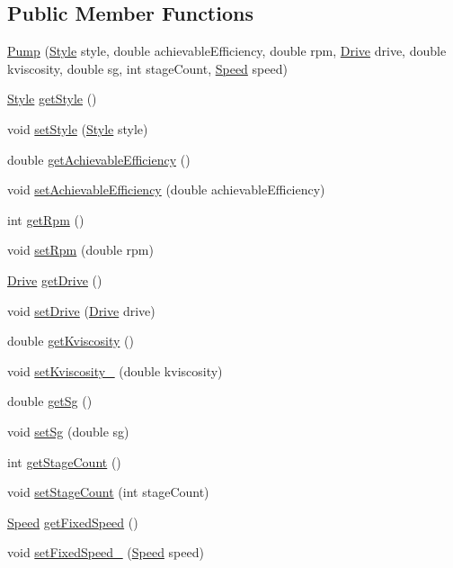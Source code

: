\subsection*{Public Member Functions}
\begin{DoxyCompactItemize}
\item 
\hyperlink{class_pump_a40479645281006efd81d3074f64d84ea}{Pump} (\hyperlink{class_pump_aef354601ce4218258cc898b35a1e90ff}{Style} style, double achievable\+Efficiency, double rpm, \hyperlink{class_pump_a32bf0ade131a11bb3b3fb374f638e983}{Drive} drive, double kviscosity, double sg, int stage\+Count, \hyperlink{class_pump_ae443603074ebca82f0b89209482d10b6}{Speed} speed)
\item 
\hyperlink{class_pump_aef354601ce4218258cc898b35a1e90ff}{Style} \hyperlink{class_pump_ab75d877769b5232c5ab7b4d92940579a}{get\+Style} ()
\item 
void \hyperlink{class_pump_a4852cb47f40a46ba84c7dff91d1abd53}{set\+Style} (\hyperlink{class_pump_aef354601ce4218258cc898b35a1e90ff}{Style} style)
\item 
double \hyperlink{class_pump_acf100af543142ab8404fc0ce2df1d157}{get\+Achievable\+Efficiency} ()
\item 
void \hyperlink{class_pump_a183f83fcc4b77e330451000df4d91046}{set\+Achievable\+Efficiency} (double achievable\+Efficiency)
\item 
int \hyperlink{class_pump_a66870deae37979d64a910b89c6977b26}{get\+Rpm} ()
\item 
void \hyperlink{class_pump_a7478d85c3b89cda275b039673603a785}{set\+Rpm} (double rpm)
\item 
\hyperlink{class_pump_a32bf0ade131a11bb3b3fb374f638e983}{Drive} \hyperlink{class_pump_a7eae412e42d0a3351408391cd5fbef4e}{get\+Drive} ()
\item 
void \hyperlink{class_pump_a54b6fc1aa44cc8377914ccb94738723a}{set\+Drive} (\hyperlink{class_pump_a32bf0ade131a11bb3b3fb374f638e983}{Drive} drive)
\item 
double \hyperlink{class_pump_a7b834ffb06cbfd643043e3a26ca1af6e}{get\+Kviscosity} ()
\item 
void \hyperlink{class_pump_a26d1d10908f91137f5148540ceb6520a}{set\+Kviscosity\+\_\+} (double kviscosity)
\item 
double \hyperlink{class_pump_ae30109b8533176cc1c7c80cf9df95631}{get\+Sg} ()
\item 
void \hyperlink{class_pump_a9b9773b74e0e56acece38107ab547728}{set\+Sg} (double sg)
\item 
int \hyperlink{class_pump_a2a8754f53b289dc41f3220adc4eb56e1}{get\+Stage\+Count} ()
\item 
void \hyperlink{class_pump_a28943405616a792c970b7e9bbf01c1b2}{set\+Stage\+Count} (int stage\+Count)
\item 
\hyperlink{class_pump_ae443603074ebca82f0b89209482d10b6}{Speed} \hyperlink{class_pump_ae9a63b7e616ba2ef7723d1040af241b4}{get\+Fixed\+Speed} ()
\item 
void \hyperlink{class_pump_a9e74b484f468a14076fb12d8b991e24b}{set\+Fixed\+Speed\+\_\+} (\hyperlink{class_pump_ae443603074ebca82f0b89209482d10b6}{Speed} speed)
\end{DoxyCompactItemize}


